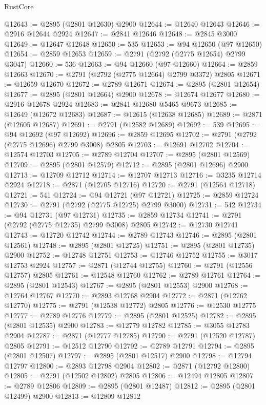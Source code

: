 \begin{lexlean}{RustCore}
\begin{coremodule}
@12643 := @2895 (@2801 @12630) @2900
@12644 := @12640 @12643
@12646 := @2916 @12644 @2924
@12647 := @2841 @12646
@12648 := @2845 @3000
@12649 := @12647 @12648
@12650 := 535
@12653 := @94 @12650 (@97 @12650)
@12654 := @2859 @12653
@12659 := @2791 (@2792 (@2775 @12654) @2799 @3047)
@12660 := 536
@12663 := @94 @12660 (@97 @12660)
@12664 := @2859 @12663
@12670 := @2791 (@2792 (@2775 @12664) @2799 @3372) @2805
@12671 := @12659 @12670
@12672 := @2789 @12671
@12674 := @2895 (@2801 @12654)
@12677 := @2895 (@2801 @12664) @2900
@12678 := @12674 @12677
@12680 := @2916 @12678 @2924
@12683 := @2841 @12680 @5465 @9673
@12685 := @12649 (@12672 @12683)
@12687 := @12615 (@12638 @12685)
@12689 := @2871 (@12605 @12687)
@12691 := @2791 (@12582 @12689)
@12692 := 539
@12695 := @94 @12692 (@97 @12692)
@12696 := @2859 @12695
@12702 := @2791 (@2792 (@2775 @12696) @2799 @3008) @2805
@12703 := @12691 @12702
@12704 := @12574 @12703
@12705 := @2789 @12704
@12707 := @2895 (@2801 @12569)
@12709 := @2895 (@2801 @12579)
@12712 := @2895 (@2801 @12696) @2900
@12713 := @12709 @12712
@12714 := @12707 @12713
@12716 := @3235 @12714 @2924
@12718 := @2871 (@12705 @12716)
@12720 := @2791 (@12564 @12718)
@12721 := 541
@12724 := @94 @12721 (@97 @12721)
@12725 := @2859 @12724
@12730 := @2791 (@2792 (@2775 @12725) @2799 @3000)
@12731 := 542
@12734 := @94 @12731 (@97 @12731)
@12735 := @2859 @12734
@12741 := @2791 (@2792 (@2775 @12735) @2799 @3008) @2805
@12742 := @12730 @12741
@12743 := @12720 @12742
@12744 := @2789 @12743
@12746 := @2895 (@2801 @12561)
@12748 := @2895 (@2801 @12725)
@12751 := @2895 (@2801 @12735) @2900
@12752 := @12748 @12751
@12753 := @12746 @12752
@12755 := @3017 @12753 @2924
@12757 := @2871 (@12744 @12755)
@12760 := @2791 (@12556 @12757) @2805
@12761 := @12548 @12760
@12762 := @2789 @12761
@12764 := @2895 (@2801 @12543)
@12767 := @2895 (@2801 @12553) @2900
@12768 := @12764 @12767
@12770 := @2893 @12768 @2904
@12772 := @2871 (@12762 @12770)
@12775 := @2791 (@12538 @12772) @2805
@12776 := @12530 @12775
@12777 := @2789 @12776
@12779 := @2895 (@2801 @12525)
@12782 := @2895 (@2801 @12535) @2900
@12783 := @12779 @12782
@12785 := @3055 @12783 @2904
@12787 := @2871 (@12777 @12785)
@12790 := @2791 (@12520 @12787) @2805
@12791 := @12512 @12790
@12792 := @2789 @12791
@12794 := @2895 (@2801 @12507)
@12797 := @2895 (@2801 @12517) @2900
@12798 := @12794 @12797
@12800 := @2893 @12798 @2904
@12802 := @2871 (@12792 @12800)
@12805 := @2791 (@12502 @12802) @2805
@12806 := @12494 @12805
@12807 := @2789 @12806
@12809 := @2895 (@2801 @12487)
@12812 := @2895 (@2801 @12499) @2900
@12813 := @12809 @12812

\end{coremodule}
\end{lexlean}

